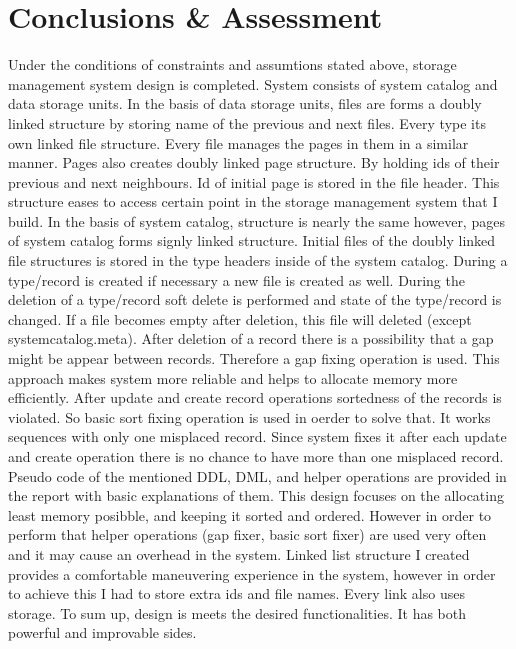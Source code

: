 \documentclass{article}
\begin{document}
\newpage
\textbf{}
\bigskip
\section{Conclusions & Assessment}

Under the conditions of constraints and assumtions stated above, storage management system design is completed. System consists of system catalog and data storage units. In the basis of data storage units, files are forms a doubly linked structure by storing name of the previous and next files. Every type its own linked file structure. Every file manages the pages in them in a similar manner. Pages also creates doubly linked page structure. By holding ids of their previous and next neighbours. Id of initial page is stored in the file header. This structure eases to access certain point in the storage management system that I build. In the basis of system catalog, structure is nearly the same however, pages of system catalog forms signly linked structure. Initial files of the doubly linked file structures is stored in the type headers inside of the system catalog. During a type/record is created if necessary a new file is created as well. During the deletion of a type/record soft delete is performed and state of the type/record is changed. If a file becomes empty after deletion, this file will deleted (except systemcatalog.meta). After deletion of a record there is a possibility that a gap might be appear between records. Therefore a gap fixing operation is used. This approach makes system more reliable and helps to allocate memory more efficiently. After update and create record operations sortedness of the records is violated. So basic sort fixing operation is used in oerder to solve that. It works sequences with only one misplaced record. Since system fixes it after each update and create operation there is no chance to have more than one misplaced record. Pseudo code of the mentioned DDL, DML, and helper operations are provided in the report with basic explanations of them. This design focuses on the allocating least memory posibble, and keeping it sorted and ordered. However in order to perform that helper operations (gap fixer, basic sort fixer) are used very often and it may cause an overhead in the system. Linked list structure I created provides a comfortable maneuvering experience in the system, however in order to achieve this I had to store extra ids and file names. Every link also uses storage. To sum up, design is meets the desired functionalities. It has both powerful and improvable sides.
\end{document}
